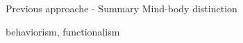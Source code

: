 \begin{frame}{Previous approache - Summary}
    Mind-body distinction
    
    behaviorism, functionalism
\end{frame}
